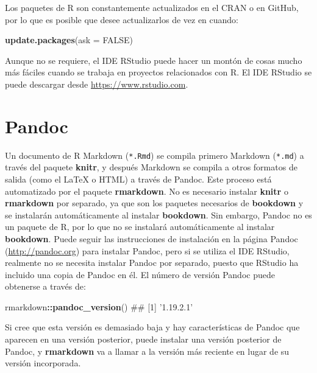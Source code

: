 \documentclass[12pt,]{krantz}
\makeatletter
\newenvironment{Shaded}{\begin{snugshade}}{\end{snugshade}}
\newcommand{\KeywordTok}[1]{\textcolor[rgb]{0.13,0.29,0.53}{\textbf{#1}}}
\newcommand{\DataTypeTok}[1]{\textcolor[rgb]{0.13,0.29,0.53}{#1}}
\newcommand{\OtherTok}[1]{\textcolor[rgb]{0.56,0.35,0.01}{#1}}
\newcommand{\OperatorTok}[1]{\textcolor[rgb]{0.81,0.36,0.00}{\textbf{#1}}}
\newcommand{\NormalTok}[1]{#1}
\newenvironment{kframe}{%
\medskip{}
\setlength{\fboxsep}{.8em}
 \def\at@end@of@kframe{}%
 \ifinner\ifhmode%
  \def\at@end@of@kframe{\end{minipage}}%
  \begin{minipage}{\columnwidth}%
 \fi\fi%
 \def\FrameCommand##1{\hskip\@totalleftmargin \hskip-\fboxsep
 \colorbox{shadecolor}{##1}\hskip-\fboxsep
     \hskip-\linewidth \hskip-\@totalleftmargin \hskip\columnwidth}%
 \MakeFramed {\advance\hsize-\width
   \@totalleftmargin\z@ \linewidth\hsize
   \@setminipage}}%
 {\par\unskip\endMakeFramed%
 \at@end@of@kframe}
\renewenvironment{Shaded}{\begin{kframe}}{\end{kframe}}
\theoremstyle{definition}
\theoremstyle{definition}
\theoremstyle{definition}
\theoremstyle{remark}
\makeatother
\begin{document}
Los paquetes de R son constantemente actualizados en el CRAN o en
GitHub, por lo que es posible que desee actualizarlos de vez en cuando:

\begin{Shaded}
\begin{Highlighting}[]
\KeywordTok{update.packages}\NormalTok{(}\DataTypeTok{ask =} \OtherTok{FALSE}\NormalTok{)}
\end{Highlighting}
\end{Shaded}

Aunque no se requiere, el IDE RStudio puede hacer un montón de cosas
mucho más fáciles cuando se trabaja en proyectos relacionados con R. El
IDE RStudio se puede descargar desde \url{https://www.rstudio.com}.

\section{Pandoc}\label{pandoc}

Un documento de R Markdown (\texttt{*.Rmd}) se compila primero Markdown
(\texttt{*.md}) a través del paquete \textbf{knitr}, y después Markdown
se compila a otros formatos de salida (como el LaTeX o HTML) a través de
Pandoc. Este proceso está automatizado por el paquete
\textbf{rmarkdown}. No es necesario instalar \textbf{knitr} o
\textbf{rmarkdown} por separado, ya que son los paquetes necesarios de
\textbf{bookdown} y se instalarán automáticamente al instalar
\textbf{bookdown}. Sin embargo, Pandoc no es un paquete de R, por lo que
no se instalará automáticamente al instalar \textbf{bookdown}. Puede
seguir las instrucciones de instalación en la página Pandoc
(\url{http://pandoc.org}) para instalar Pandoc, pero si se utiliza el
IDE RStudio, realmente no se necesita instalar Pandoc por separado,
puesto que RStudio ha incluido una copia de Pandoc en él. El número de
versión Pandoc puede obtenerse a través de:

\begin{Shaded}
\begin{Highlighting}[]
\NormalTok{rmarkdown}\OperatorTok{::}\KeywordTok{pandoc_version}\NormalTok{()}
\NormalTok{## [1] '1.19.2.1'}
\end{Highlighting}
\end{Shaded}

Si cree que esta versión es demasiado baja y hay características de
Pandoc que aparecen en una versión posterior, puede instalar una versión
posterior de Pandoc, y \textbf{rmarkdown} va a llamar a la versión más
reciente en lugar de su versión incorporada.
\end{document}
